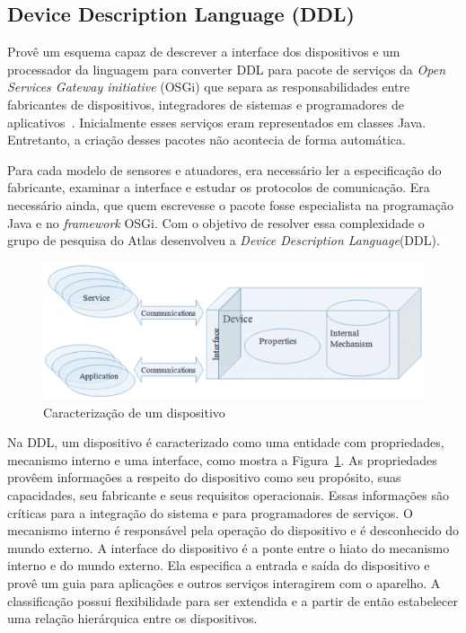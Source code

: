 \subsection{Device Description Language (DDL)}
\label{subsec:ddl}

Provê um esquema capaz de descrever a interface dos dispositivos e um processador da linguagem para converter DDL para pacote de serviços da \emph{Open Services Gateway initiative} (OSGi) que separa as responsabilidades entre fabricantes de dispositivos, integradores de sistemas e programadores de aplicativos~\cite{gatorTechDDL}. Inicialmente esses serviços eram representados em classes Java. Entretanto, a criação desses pacotes não acontecia de forma automática. 

Para cada modelo de sensores e atuadores, era necessário ler a especificação do fabricante, examinar a interface e estudar os protocolos de comunicação. Era necessário ainda, que quem escrevesse o pacote fosse especialista na programação Java e no \emph{framework} OSGi. Com o objetivo de resolver essa complexidade o grupo de pesquisa do Atlas desenvolveu a \emph{Device Description Language}(DDL).

\begin{figure}[ht]
\center
\includegraphics[scale=0.4]{imagens/gatorDDL}
\caption{Caracterização de um dispositivo~\cite{ddlSpec}}
\label{fig:ddlspec}
\end{figure}

Na DDL, um dispositivo é caracterizado como uma entidade com propriedades, mecanismo interno e uma interface, como mostra a Figura~\ref{fig:ddlspec}. As propriedades provêem informações a respeito do dispositivo como seu propósito, suas capacidades, seu fabricante e seus requisitos operacionais. Essas informações são críticas para a integração do sistema e para programadores de serviços. O mecanismo interno é responsável pela operação do dispositivo e é desconhecido do mundo externo. A interface do dispositivo é a ponte entre o hiato do mecanismo interno e do mundo externo. Ela especifica a entrada e saída do dispositivo e provê um guia para aplicações e outros serviços interagirem com o aparelho. A classificação possui flexibilidade para ser extendida e a partir de então estabelecer uma relação hierárquica entre os dispositivos.

